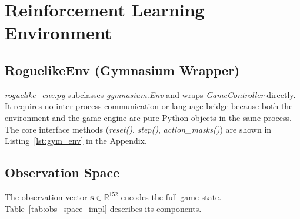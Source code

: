 \section{Reinforcement Learning Environment}

\subsection{RoguelikeEnv (Gymnasium Wrapper)}

\textit{roguelike\_env.py} subclasses \textit{gymnasium.Env} and wraps \textit{GameController} directly. It requires no inter-process communication or language bridge because both the environment and the game engine are pure Python objects in the same process. The core interface methods (\textit{reset()}, \textit{step()}, \textit{action\_masks()}) are shown in Listing~\ref{lst:gym_env} in the Appendix.

\subsection{Observation Space}

The observation vector $\mathbf{s} \in \mathbb{R}^{152}$ encodes the full game state. Table~\ref{tab:obs_space_impl} describes its components.

